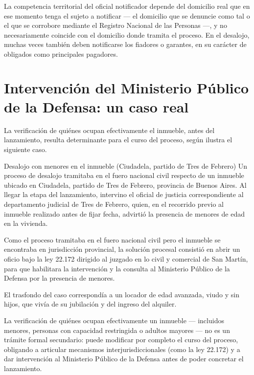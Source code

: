 \documentclass[12pt,oneside]{book}
\begin{document}
La competencia territorial del oficial notificador depende del domicilio real que en ese momento tenga el sujeto a notificar --- el domicilio que se denuncie como tal o el que se corrobore mediante el Registro Nacional de las Personas ---, y no necesariamente coincide con el domicilio donde tramita el proceso. En el desalojo, muchas veces también deben notificarse los fiadores o garantes, en su carácter de obligados como principales pagadores.

\section{Intervención del Ministerio Público de la Defensa: un caso real}

La verificación de quiénes ocupan efectivamente el inmueble, antes del lanzamiento, resulta determinante para el curso del proceso, según ilustra el siguiente caso.

\begin{example}{Desalojo con menores en el inmueble (Ciudadela, partido de Tres de Febrero)}
Un proceso de desalojo tramitaba en el fuero nacional civil respecto de un inmueble ubicado en Ciudadela, partido de Tres de Febrero, provincia de Buenos Aires. Al llegar la etapa del lanzamiento, intervino el oficial de justicia correspondiente al departamento judicial de Tres de Febrero, quien, en el recorrido previo al inmueble realizado antes de fijar fecha, advirtió la presencia de menores de edad en la vivienda.

Como el proceso tramitaba en el fuero nacional civil pero el inmueble se encontraba en jurisdicción provincial, la solución procesal consistió en abrir un oficio bajo la ley 22.172 dirigido al juzgado en lo civil y comercial de San Martín, para que habilitara la intervención y la consulta al Ministerio Público de la Defensa por la presencia de menores.

El trasfondo del caso correspondía a un locador de edad avanzada, viudo y sin hijos, que vivía de su jubilación y del ingreso del alquiler.
\end{example}

\begin{important}
La verificación de quiénes ocupan efectivamente un inmueble --- incluidos menores, personas con capacidad restringida o adultos mayores --- no es un trámite formal secundario: puede modificar por completo el curso del proceso, obligando a articular mecanismos interjurisdiccionales (como la ley 22.172) y a dar intervención al Ministerio Público de la Defensa antes de poder concretar el lanzamiento.
\end{important}
\end{document}
